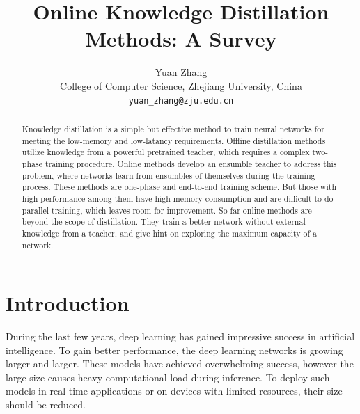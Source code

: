 \documentclass[10pt,twocolumn,letterpaper]{article}
\begin{document}
\title{Online Knowledge Distillation Methods: A Survey}

\author{Yuan Zhang\\
College of Computer Science, Zhejiang University, China\\
{\tt\small yuan\_zhang@zju.edu.cn}
}

\maketitle

\begin{abstract}
Knowledge distillation is a simple but effective method to
train neural networks for meeting the low-memory and
low-latancy requirements. Offline
distillation methods utilize knowledge from
a powerful pretrained teacher, which requires
a complex two-phase training procedure.
Online methods develop an ensumble teacher to
address this problem, where networks learn from
ensumbles of themselves during the training process.
These methods are one-phase and end-to-end training scheme.
But those with high performance among
them have high memory consumption and are difficult to do
parallel training, which leaves room for improvement.
So far online methods are beyond the scope of 
distillation. They train a better network
without external knowledge from a teacher,
and give hint on exploring the maximum capacity
of a network.
\end{abstract}

\section{Introduction}
During the last few years, deep learning has gained impressive success
in artificial intelligence. To gain better performance, the deep learning networks
is growing larger and larger. These models have achieved overwhelming
success, however the large size causes heavy computational load during inference. To
deploy such models in real-time applications or on devices with limited resources,
their size should be reduced.
\end{document}
